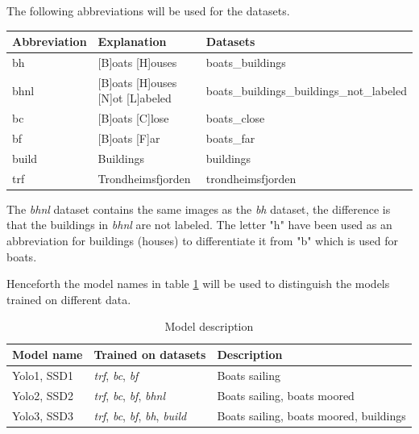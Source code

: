\vspace{3mm}
\noindent
The following abbreviations will be used for the datasets. 

\begin{table}[h!]
\begin{tabular}{l|l|l}
Abbreviation & Explanation                                      & Datasets                                  \\ \hline
bh           & {[}B{]}oats {[}H{]}ouses                         & boats\_buildings                          \\
bhnl         & {[}B{]}oats {[}H{]}ouses {[}N{]}ot {[}L{]}abeled & boats\_buildings\_buildings\_not\_labeled \\
bc           & {[}B{]}oats {[}C{]}lose                          & boats\_close                              \\
bf           & {[}B{]}oats {[}F{]}ar                            & boats\_far                                \\
build        & Buildings                                        & buildings                                 \\
trf          & Trondheimsfjorden                                & trondheimsfjorden                        
\end{tabular}
\end{table}

The \textit{bhnl} dataset contains the same images as the \textit{bh} dataset, the difference is that the buildings in \textit{bhnl} are not labeled. The letter "h" have been used as an abbreviation for buildings (houses) to differentiate it from "b" which is used for boats.

\vspace{3mm}

Henceforth the model names in table \ref{tab_models} will be used to distinguish the models trained on different data.

\begin{table}[h!]
\centering
\begin{tabular}{l|ll}
Model name  & Trained on datasets    & Description                        \\ \hline
Yolo1, SSD1 & \textit{trf}, \textit{bc}, \textit{bf}            & Boats sailing                           \\
Yolo2, SSD2 & \textit{trf}, \textit{bc}, \textit{bf}, \textit{bhnl}      & Boats sailing, boats moored            \\
Yolo3, SSD3 & \textit{trf}, \textit{bc}, \textit{bf}, \textit{bh}, \textit{build} & Boats sailing, boats moored, buildings
\end{tabular}
\caption{Model description}
\label{tab_models}
\end{table}

